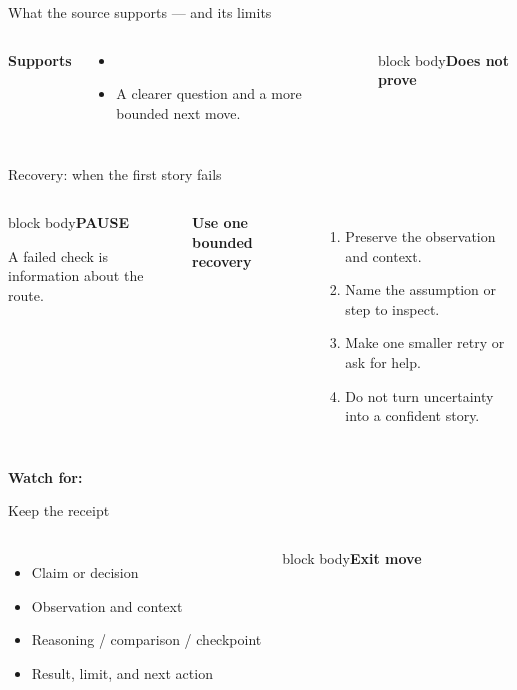 \documentclass[aspectratio=169,11pt]{beamer}
\begin{document}
\begin{frame}{What the source supports — and its limits}\begin{columns}[T]\textbf{Supports}\begin{itemize}\item \DeckSupports\item A clearer question and a more bounded next move.\end{itemize}\begin{beamercolorbox}[sep=.75em,wd=\linewidth]{block body}\textcolor{ccgold!80!black}{\textbf{Does not prove}}\par\vspace{.2cm}\DeckLimits\end{beamercolorbox}\end{columns}\vfill\securityquestions\end{frame}
\begin{frame}{Recovery: when the first story fails}\begin{columns}[T]\begin{beamercolorbox}[sep=.8em,wd=\linewidth]{block body}\centering\Huge\textbf{PAUSE}\par\vspace{.2cm}\normalsize A failed check is information about the route.\end{beamercolorbox}\textbf{Use one bounded recovery}\begin{enumerate}\item Preserve the observation and context.\item Name the assumption or step to inspect.\item Make one smaller retry or ask for help.\item Do not turn uncertainty into a confident story.\end{enumerate}\end{columns}\vfill\textcolor{ccgreen}{\textbf{Watch for:}} \DeckWatch\end{frame}
\begin{frame}{Keep the receipt}\begin{columns}[T]\begin{itemize}\item Claim or decision\item Observation and context\item Reasoning / comparison / checkpoint\item Result, limit, and next action\end{itemize}\begin{beamercolorbox}[wd=\linewidth,sep=.6em]{block body}\textcolor{ccgold!80!black}{\textbf{Exit move}}\par\DeckExit\end{beamercolorbox}\end{columns}\vfill{}\end{frame}
\end{document}
